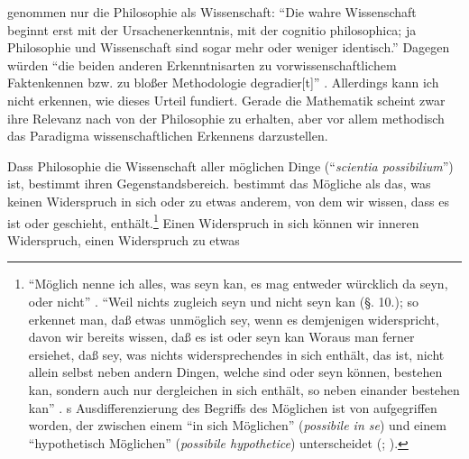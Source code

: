 \begin{nummerierung}
{genommen nur die Philosophie als Wissenschaft: \enquote{Die wahre Wissenschaft
beginnt erst mit der Ursachenerkenntnis, mit der cognitio philosophica; ja
Philosophie und Wissenschaft sind sogar mehr oder weniger identisch.} Dagegen
würden \enquote{die beiden anderen Erkenntnisarten zu vorwissenschaftlichem
Faktenkennen bzw. zu bloßer Methodologie {\punkt} degradier[t]}
\parencite[vgl.][15]{Schneiders:Deusestphilosophusabsolutesummus1986}.
Allerdings kann ich nicht erkennen, wie
 dieses Urteil
fundiert. Gerade die Mathematik scheint zwar ihre Relevanz nach
 von der Philosophie zu erhalten, aber
vor allem methodisch das Paradigma wissenschaftlichen Erkennens darzustellen.}

\item Dass Philosophie die Wissenschaft aller möglichen Dinge
(\enquote{\emph{scientia possibilium}}) ist, bestimmt ihren Gegenstandsbereich.
bestimmt das Mögliche als das, was keinen Widerspruch in sich oder zu etwas anderem,
von dem wir wissen, dass es ist oder geschieht, enthält.\footnote{\enquote{Möglich nenne ich alles, was seyn kan, es mag entweder würcklich da
seyn, oder nicht} \parencite[][Vorbericht,
\S~3]{Wolff:VernuenftigeGedankenvondenKraeftendesmenschlichenVerstandesundihremrichtigenGebraucheinErkenntnisderWahrheit1978}. \enquote{Weil
nichts zugleich seyn und nicht seyn kan (\S . 10.); so erkennet man, daß etwas
unmöglich sey, wenn es demjenigen widerspricht, davon wir bereits wissen, daß es
ist oder seyn kan\punkt{} Woraus man ferner ersiehet, daß  sey, was
nichts widersprechendes in sich enthält, das ist, nicht
allein selbst neben andern Dingen, welche sind oder seyn können, bestehen kan,
sondern auch nur dergleichen in sich enthält, so neben einander bestehen kan}
\parencite[][\S~12]{Wolff:VernuenftigeGedanckenvonGottderWeltundderSeeledesMenschenauchallenDingenueberhauptDeutscheMetaphysik1983}.
s Ausdifferenzierung des Begriffs des Möglichen ist von
 aufgegriffen worden,
der zwischen einem \enquote{in
sich Möglichen} (\emph{possibile in se}) und einem \enquote{hypothetisch
Möglichen} (\emph{possibile hypothetice}) unterscheidet
\mkbibparens{\cite[Vgl.][\S\S~15--18]{Baumgarten:Metaphysica---Metaphysik2011};
\cite[][XVII: 29.16--24, 30.8--23]{Kant:GesammelteWerke1900ff.}}.} Einen
Widerspruch in sich können wir inneren Widerspruch, einen Widerspruch zu etwas

\end{nummerierung}
